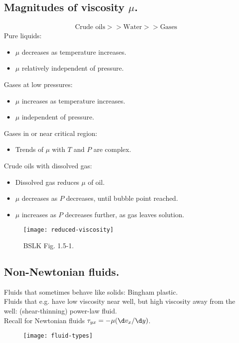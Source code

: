 \subsection{Magnitudes of viscosity $\mu$.}
\begin{align*}
	\text{Crude oils} >> \text{Water} >> \text{Gases}
\end{align*}
Pure liquids:
\begin{itemize}
	\item $\mu$ decreases as temperature increases.
	\item $\mu$ relatively independent of pressure.
\end{itemize}
Gases at low pressures:
\begin{itemize}
	\item $\mu$ increases as temperature increases.
	\item $\mu$ independent of pressure.
\end{itemize}
Gases in or near critical region:
\begin{itemize}
	\item Trends of $\mu$ with $T$ and $P$ are complex.
\end{itemize}
Crude oils with dissolved gas:
\begin{itemize}
	\item Dissolved gas reduces $\mu$ of oil.
	\item $\mu$ decreases as $P$ decreases, until bubble point reached.
	\item $\mu$ increases as $P$ decreases further, as gas leaves solution.
\end{itemize}
\begin{figure}[H]
	\centering
	\texttt{[image: reduced-viscosity]}
	\caption{BSLK Fig. 1.5-1.}
\end{figure}

\subsection{Non-Newtonian fluids.}
Fluids that sometimes behave like solids: Bingham plastic.\\
Fluids that e.g. have low viscosity near well, but high viscosity away from the well: (shear-thinning) power-law fluid.\\
Recall for Newtonian fluids $\tau_{yx}=-\mu(\d v_x/\d y)$.
\begin{figure}[H]
	\centering
	\texttt{[image: fluid-types]}
\end{figure}

